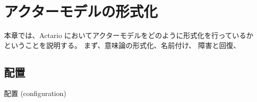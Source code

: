 \chapter{アクターモデルの形式化}

本章では、Actario においてアクターモデルをどのように形式化を行っているかということを説明する。
まず、意味論の形式化、名前付け、
障害と回復、




\section{配置}

配置 (configuration)
